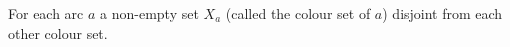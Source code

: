 \documentclass[preview]{standalone}
\begin{document}
For each arc $a$ a non-empty set $X_a$ (called the colour set of $a$) disjoint from each other colour set.\\
\end{document}
